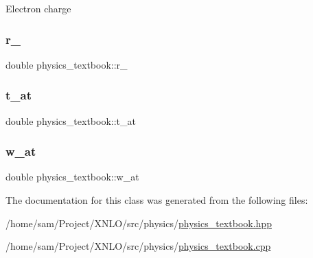 Electron charge \mbox{\label{classphysics__textbook_ac429976f0dc885d846d8b31c24f45bd6}} 
\subsubsection{\texorpdfstring{r\+\_}{r\_0}}
{\footnotesize\ttfamily double physics\+\_\+textbook\+::r\+\_}

\mbox{\label{classphysics__textbook_acdcf772ff70c544f8394b3a9fc57674c}} 
\subsubsection{\texorpdfstring{t\+\_\+at}{t\_at}}
{\footnotesize\ttfamily double physics\+\_\+textbook\+::t\+\_\+at}

\mbox{\label{classphysics__textbook_a63250c79f053fa4aa1c8f3505971b4f1}} 
\subsubsection{\texorpdfstring{w\+\_\+at}{w\_at}}
{\footnotesize\ttfamily double physics\+\_\+textbook\+::w\+\_\+at}



The documentation for this class was generated from the following files\+:\begin{DoxyCompactItemize}
\item 
/home/sam/\+Project/\+X\+N\+L\+O/src/physics/\hyperlink{physics__textbook_8hpp}{physics\+\_\+textbook.\+hpp}\item 
/home/sam/\+Project/\+X\+N\+L\+O/src/physics/\hyperlink{physics__textbook_8cpp}{physics\+\_\+textbook.\+cpp}\end{DoxyCompactItemize}
